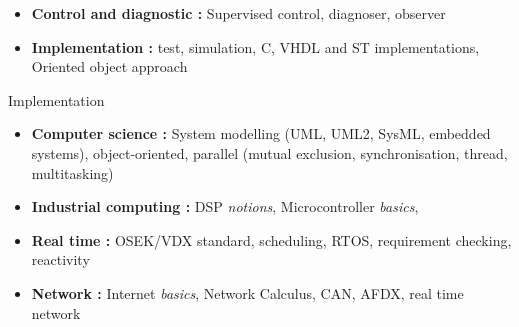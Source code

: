 \documentclass[11pt,a4paper,sans]{moderncv}        %
\newcommand{\myitem}{\textbullet}
\begin{document}
\begin{samepage}
{{\begin{itemize}[label=\myitem]
		\item \textbf{Control and diagnostic : }%
		{\small Supervised control, diagnoser, observer}
		\item \textbf{Implementation : }%
		{\small test, simulation, C, VHDL and ST implementations, Oriented object approach}
		\end{itemize}}}%
%
{Implementation}%
{{%
		\begin{itemize}[label=\myitem]%
\item \textbf{Computer science : }%
{\small System modelling (UML, UML2, SysML, embedded systems), object-oriented, parallel (mutual exclusion, synchronisation, thread, multitasking)}%
\item \textbf{Industrial computing : }%
{\small DSP \textit{notions}, Microcontroller \textit{basics}, } %
\item \textbf{Real time : }%
{\small OSEK/VDX standard, scheduling, RTOS, requirement checking, reactivity}%
\item \textbf{Network : }%
{\small Internet \textit{basics}, Network Calculus, CAN, AFDX, real time network}%
	\end{itemize}%
}}%
	

\end{samepage}
\end{document}
